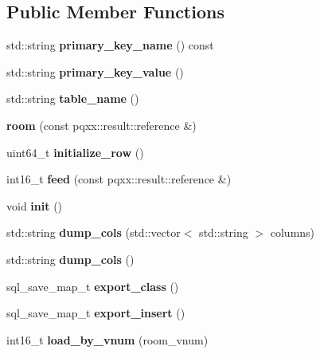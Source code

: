 \subsection*{Public Member Functions}
\begin{DoxyCompactItemize}
\item 
\mbox{\label{structmods_1_1orm_1_1room_a3576eaddeb942e240339a6d25f2687c4}} 
std\+::string {\bfseries primary\+\_\+key\+\_\+name} () const
\item 
\mbox{\label{structmods_1_1orm_1_1room_a2a0d8190b01da72145550abcd9d82e36}} 
std\+::string {\bfseries primary\+\_\+key\+\_\+value} ()
\item 
\mbox{\label{structmods_1_1orm_1_1room_a0e5af6d871925da2876172db39f724d3}} 
std\+::string {\bfseries table\+\_\+name} ()
\item 
\mbox{\label{structmods_1_1orm_1_1room_ab4e4972e266edffab53ea6088fe932c1}} 
{\bfseries room} (const pqxx\+::result\+::reference \&)
\item 
\mbox{\label{structmods_1_1orm_1_1room_a0827122b0c3a4a127e6447e25f6c8bbf}} 
uint64\+\_\+t {\bfseries initialize\+\_\+row} ()
\item 
\mbox{\label{structmods_1_1orm_1_1room_a9b4f6ff7afa65af1501bf36735fc7de0}} 
int16\+\_\+t {\bfseries feed} (const pqxx\+::result\+::reference \&)
\item 
\mbox{\label{structmods_1_1orm_1_1room_a07560b5ed1da09e844e862f6feb10c6a}} 
void {\bfseries init} ()
\item 
\mbox{\label{structmods_1_1orm_1_1room_a7289240d350171fa0036782232e70637}} 
std\+::string {\bfseries dump\+\_\+cols} (std\+::vector$<$ std\+::string $>$ columns)
\item 
\mbox{\label{structmods_1_1orm_1_1room_a240eedf614786cfb172f876a9b2ba377}} 
std\+::string {\bfseries dump\+\_\+cols} ()
\item 
\mbox{\label{structmods_1_1orm_1_1room_ae27ae82fade44cdfaa686896459ebdd8}} 
sql\+\_\+save\+\_\+map\+\_\+t {\bfseries export\+\_\+class} ()
\item 
\mbox{\label{structmods_1_1orm_1_1room_a67c02a2f0b40c8b1831703f16692915f}} 
sql\+\_\+save\+\_\+map\+\_\+t {\bfseries export\+\_\+insert} ()
\item 
\mbox{\label{structmods_1_1orm_1_1room_aa2a43451d84b76f8e3743395d0e39b7e}} 
int16\+\_\+t {\bfseries load\+\_\+by\+\_\+vnum} (room\+\_\+vnum)
\end{DoxyCompactItemize}
